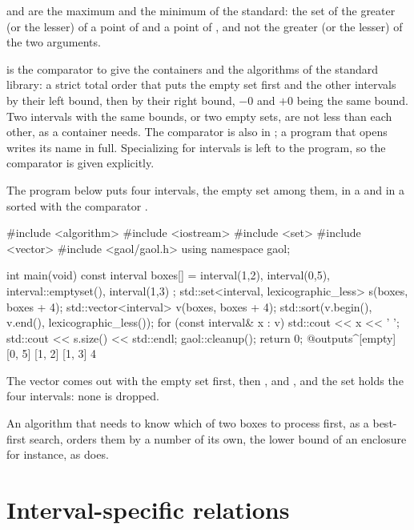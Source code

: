 \documentclass[12pt,a4paper,twoside,openright]{book}
\begin{document}
\medskip
{} and  are the maximum and the
minimum of the standard: the set of the greater (or the lesser) of a point of
 and a point of , and not the greater (or the lesser) of the
two arguments.

\medskip
{} is the comparator to give the containers
and the algorithms of the standard library: a strict total order that puts
the empty set first and the other intervals by their left bound, then by
their right bound, $-0$ and $+0$ being the same bound.\newinvfive{} Two
intervals with the same bounds, or two empty sets, are not less than each
other, as a container needs. The comparator is also in ; a
program that opens  writes its name in full.
Specializing  for intervals is left to the program, so the
comparator is given explicitly.

\begin{Ex}\label{ex:relations-containers}
The program below puts four intervals, the empty set among them, in a
 and in a sorted  with the comparator
.
\begin{example}
#include <algorithm>
#include <iostream>
#include <set>
#include <vector>
#include <gaol/gaol.h>
using namespace gaol;

int main(void)
{
  const interval boxes[] = { interval(1,2), interval(0,5),
                             interval::emptyset(), interval(1,3) };
  std::set<interval, lexicographic_less> s(boxes, boxes + 4);
  std::vector<interval> v(boxes, boxes + 4);
  std::sort(v.begin(), v.end(), lexicographic_less());
  for (const interval& x : v) std::cout << x << ' ';
  std::cout << s.size() << std::endl;
  gaol::cleanup();
  return 0;
}
@outputs^[empty] [0, 5] [1, 2] [1, 3] 4~
\end{example}
The vector comes out with the empty set first, then , 
and , and the set holds the four intervals: none is dropped.
\end{Ex}

\medskip
An algorithm that needs to know which of two boxes to process first, as a
best-first search, orders them by a number of its own, the lower bound of an
enclosure for instance, as  does.

\section{Interval-specific relations}\label{sec:relations-specific}
%
\end{document}
